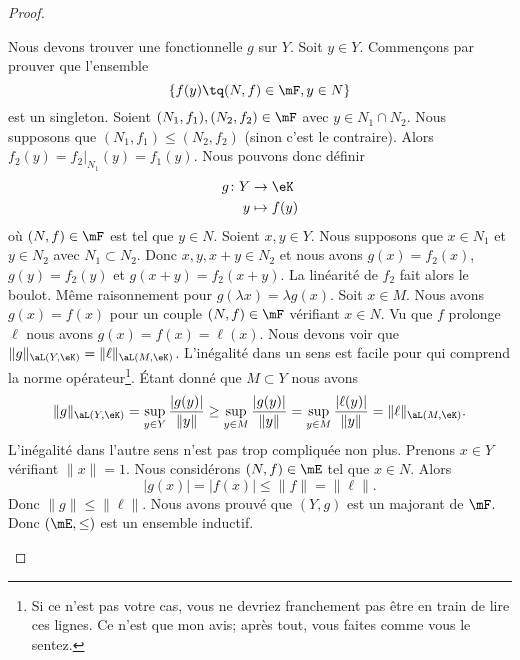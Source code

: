 \begin{proof}
\begin{subproof}
\begin{subproof}
			\spitem[La fonctionnelle]
			Nous devons trouver une fonctionnelle \( g\) sur \( Y\). Soit \( y\in Y\). Commençons par prouver que l'ensemble
			\begin{equation}
				\{ f(y)\tq (N,f)\in \mF, y\in N \}
			\end{equation}
			est un singleton. Soient \( (N_1,f_1), (N_2,f_2)\in\mF\) avec \( y\in N_1\cap N_2\). Nous supposons que \( (N_1,f_1)\leq (N_2,f_2)\) (sinon c'est le contraire). Alors \( f_2(y)=f_2|_{N_1}(y)=f_1(y)\). Nous pouvons donc définir
			\begin{equation}
				\begin{aligned}
					g\colon Y & \to \eK      \\
					y         & \mapsto f(y)
				\end{aligned}
			\end{equation}
			où \( (N,f)\in \mF\) est tel que \( y\in N\).
			Soient \( x,y\in Y\). Nous supposons que \( x\in N_1\) et \( y\in N_2\) avec \( N_1\subset N_2\). Donc \( x,y,x+y\in N_2\) et nous avons \( g(x)=f_2(x)\), \( g(y)=f_2(y)\) et \( g(x+y)=f_2(x+y)\). La linéarité de \( f_2\) fait alors le boulot. Même raisonnement pour \( g(\lambda x)=\lambda g(x)\).
			Soit \( x\in M\). Nous avons \( g(x)=f(x)\) pour un couple \( (N,f)\in \mF\) vérifiant \( x\in N\). Vu que \( f\) prolonge \( \ell\) nous avons \( g(x)=f(x)=\ell(x)\).
			\spitem[Norme de \( g\)]
			Nous devons voir que \( \| g \|_{\aL(Y,\eK)}=\| \ell \|_{\aL(M,\eK)}\). L'inégalité dans un sens est facile pour qui comprend la norme opérateur\footnote{Si ce n'est pas votre cas, vous ne devriez franchement pas être en train de lire ces lignes. Ce n'est que mon avis; après tout, vous faites comme vous le sentez.}. Étant donné que \( M\subset Y\) nous avons
			\begin{equation}
				\| g \|_{\aL(Y,\eK)}=\sup_{y\in Y}\frac{ | g(y) | }{ \| y \| }\geq\sup_{y\in M}\frac{ | g(y) | }{ \| y \| }=\sup_{y\in M}\frac{ | \ell(y) | }{ \| y \| }=\| \ell \|_{\aL(M,\eK)}.
			\end{equation}
			L'inégalité dans l'autre sens n'est pas trop compliquée non plus. Prenons \( x\in Y\) vérifiant \( \| x \|=1\). Nous considérons \( (N,f)\in \mE\) tel que \( x\in N\). Alors
			\begin{equation}
				| g(x) |=| f(x) |\leq\| f \|=\| \ell \|.
			\end{equation}
			Donc \( \| g \|\leq \| \ell \|\).
			Nous avons prouvé que \( (Y,g)\) est un majorant de \( \mF\). Donc \( (\mE,\leq)\) est un ensemble inductif.

\end{subproof}
\end{subproof}
\end{proof}
